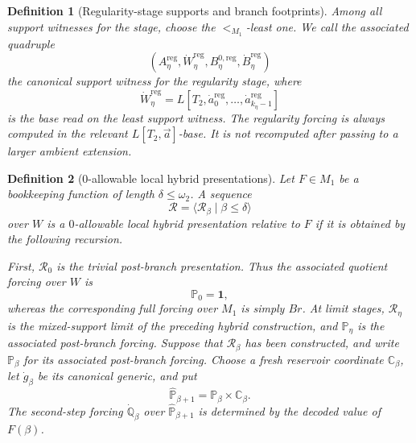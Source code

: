 \documentclass[10pt,a4paper]{amsart}
\newtheorem{definition}{Definition}
\begin{document}
\begin{definition}[Regularity-stage supports and branch footprints]
Among all support witnesses for the stage, choose the \(<_{M_1}\)-least one.  We
call the associated quadruple
\[
   (A^{\mathrm{reg}}_\eta,
    \dot W^{\mathrm{reg}}_\eta,
    B^{0,\mathrm{reg}}_\eta,
    \dot B^{\mathrm{reg}}_\eta)
\]
the \emph{canonical support witness} for the regularity stage, where
\[
   \dot W^{\mathrm{reg}}_\eta
   =L[T_2,
      \dot a^{\mathrm{reg}}_0,\ldots,
      \dot a^{\mathrm{reg}}_{k_\eta-1}]
\]
is the base read on the least support witness.  The regularity forcing is always
computed in the relevant \(L[T_2,\vec a]\)-base.  It is not recomputed after
passing to a larger ambient extension.
\end{definition}

\begin{definition}[\(0\)-allowable local hybrid presentations]
\label{def:zero-local-allowable}
Let \(F\in M_1\) be a bookkeeping function of length
\(\delta\leq\omega_2\).  A sequence
\[
   \mathcal R=\langle \mathcal R_\beta\mid \beta\leq\delta\rangle
\]
over \(W\) is a \emph{\(0\)-allowable local hybrid presentation relative to
\(F\)} if it is obtained by the following recursion.

First, \(\mathcal R_0\) is the trivial post-branch presentation.  Thus the associated quotient forcing over \(W\) is
\[
   \mathbb P_0=\mathbf 1,
\]
whereas the corresponding full forcing over \(M_1\) is simply \(Br\).
At limit stages, \(\mathcal R_\eta\) is the mixed-support limit of the preceding
hybrid construction, and \(\mathbb P_\eta\) is the associated post-branch
forcing.  Suppose that \(\mathcal R_\beta\) has been constructed, and write
\(\mathbb P_\beta\) for its associated post-branch forcing.
Choose a fresh reservoir coordinate \(\mathbb C_\beta\), let
\(\dot g_\beta\) be its canonical generic, and put
\[
   \widehat{\mathbb P}_{\beta+1}
      =
   \mathbb P_\beta\times\mathbb C_\beta.
\]
The second-step forcing \(\dot{\mathbb Q}_\beta\) over
\(\widehat{\mathbb P}_{\beta+1}\) is determined by the decoded value of
\(F(\beta)\).


\end{definition}
\end{document}
